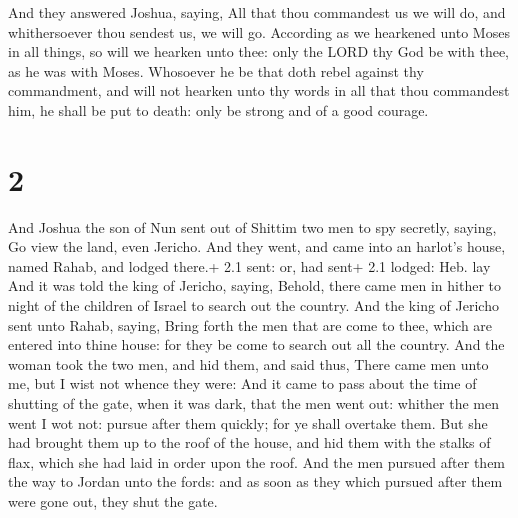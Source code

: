  And they answered Joshua, saying, All that thou
commandest us we will do, and whithersoever thou sendest us, we will go.
 According as we hearkened unto Moses in all things, so
will we hearken unto thee: only the LORD thy God be with thee, as he was
with Moses.  Whosoever he be that doth rebel against thy
commandment, and will not hearken unto thy words in all that thou
commandest him, he shall be put to death: only be strong and of a good
courage.

\hypertarget{section-1}{%
\section{2}\label{section-1}}

 And Joshua the son of Nun sent out of Shittim two men to
spy secretly, saying, Go view the land, even Jericho. And they went, and
came into an harlot's house, named Rahab, and lodged there.+ 2.1 sent:
or, had sent+ 2.1 lodged: Heb. lay  And it was told the king
of Jericho, saying, Behold, there came men in hither to night of the
children of Israel to search out the country.  And the king
of Jericho sent unto Rahab, saying, Bring forth the men that are come to
thee, which are entered into thine house: for they be come to search out
all the country.  And the woman took the two men, and hid
them, and said thus, There came men unto me, but I wist not whence they
were:  And it came to pass about the time of shutting of the
gate, when it was dark, that the men went out: whither the men went I
wot not: pursue after them quickly; for ye shall overtake them.
 But she had brought them up to the roof of the house, and
hid them with the stalks of flax, which she had laid in order upon the
roof.  And the men pursued after them the way to Jordan unto
the fords: and as soon as they which pursued after them were gone out,
they shut the gate.

